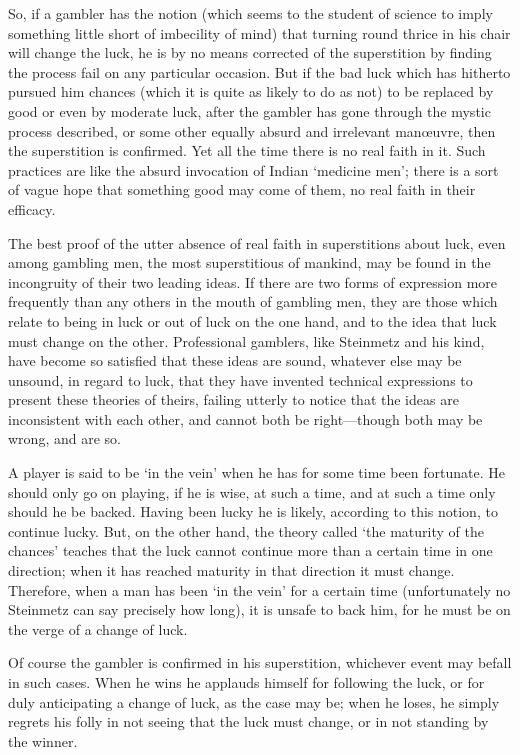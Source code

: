 \documentclass[letterpaper,12pt,oneside,openany]{memoir}
\begin{document}
So, if a gambler has the notion (which seems to the
student of science to imply something little short of
imbecility of mind) that turning round thrice in his
chair will change the luck, he is by no means corrected
of the superstition by finding the process fail on any
particular occasion. But if the bad luck which has
hitherto pursued him chances (which it is quite as
likely to do as not) to be replaced by good or even by
moderate luck, after the gambler has gone through the
mystic process described, or some other equally absurd
and irrelevant man{\oe}uvre, then the superstition is confirmed.
Yet all the time there is no real faith in it.
Such practices are like the absurd invocation of Indian
`medicine men'; there is a sort of vague hope that
something good may come of them, no real faith in
their efficacy.

The best proof of the utter absence of real faith in
superstitions about luck, even among gambling men,
the most superstitious of mankind, may be found in the
incongruity of their two leading ideas. If there are
two forms of expression more frequently than any
others in the mouth of gambling men, they are those
which relate to being in luck or out of luck on the one
hand, and to the idea that luck must change on the
other. Professional gamblers, like Steinmetz and his
kind, have become so satisfied that these ideas are
sound, whatever else may be unsound, in regard to
luck, that they have invented technical expressions to
present these theories of theirs, failing utterly to notice
that the ideas are inconsistent with each other, and
cannot both be right---though both may be wrong, and
are so.

A player is said to be `in the vein' when he has
for some time been fortunate. He should only go on
playing, if he is wise, at such a time, and at such a
time only should he be backed. Having been lucky he
is likely, according to this notion, to continue lucky.
But, on the other hand, the theory called `the maturity
of the chances' teaches that the luck cannot continue
more than a certain time in one direction; when it has
reached maturity in that direction it must change.
Therefore, when a man has been `in the vein' for a
certain time (unfortunately no Steinmetz can say precisely
how long), it is unsafe to back him, for he must
be on the verge of a change of luck.

Of course the gambler is confirmed in his superstition,
whichever event may befall in such cases. When
he wins he applauds himself for following the luck, or
for duly anticipating a change of luck, as the case may
be; when he loses, he simply regrets his folly in not
seeing that the luck must change, or in not standing
by the winner.
\end{document}
